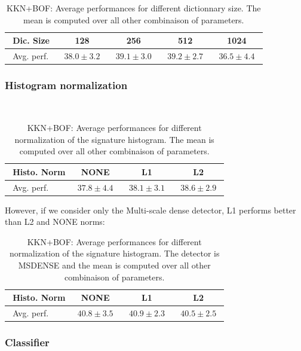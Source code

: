 \documentclass[10pt,a4paper]{llncs}
\begin{document}
\begin{table}[H]
\centering
\caption{KKN+BOF: Average performances for different dictionnary size. The mean is computed over all other combinaison of parameters.}
\label{table:KNN_BOF:DicSize}
\begin{tabular}{|l|c|c|c|c|}
\hline
$~~$Dic. Size & 128 & 256 & 512 & 1024 \\ \hline
$~~$Avg. perf.$~~$ & $~~38.0 \pm 3.2~~$ & $~~39.1 \pm 3.0~~$ & $~~\mathbf{39.2 \pm 2.7}~~$ & $~~36.5 \pm 4.4~~$ \\ \hline
\end{tabular}
\end{table}

\subsubsection{Histogram normalization}$~$\\

\begin{table}[H]
\centering
\caption{KKN+BOF: Average performances for different normalization of the signature histogram. The mean is computed over all other combinaison of parameters.}
\label{table:KNN_BOF:Histonorm}
\begin{tabular}{|l|c|c|c|}
\hline
$~~$Histo. Norm & NONE & L1 & L2 \\ \hline
$~~$Avg. perf.$~~$ & $~~37.8 \pm 4.4~~$ & $~~38.1 \pm 3.1~~$ & $~~\mathbf{38.6 \pm 2.9}~~$ \\ \hline
\end{tabular}
\end{table}

However, if we consider only the Multi-scale dense detector, L1 performs better than L2 and NONE norms:

\begin{table}[H]
\centering
\caption{KKN+BOF: Average performances for different normalization of the signature histogram. The detector is MSDENSE and the mean is computed over all other combinaison of parameters.}
\label{table:KNN_BOF:HistonormMSDENSE}
\begin{tabular}{|l|c|c|c|}
\hline
$~~$Histo. Norm & NONE & L1 & L2 \\ \hline
$~~$Avg. perf.$~~$ & $~~40.8 \pm 3.5~~$ & $~~\mathbf{40.9 \pm 2.3}~~$ & $~~40.5 \pm 2.5~~$ \\ \hline
\end{tabular}
\end{table}


\subsubsection{Classifier}$~$\\
\end{document}
